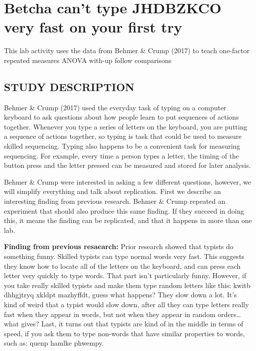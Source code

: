 \documentclass[
]{book}
\begin{document}
\hypertarget{betcha-cant-type-jhdbzkco-very-fast-on-your-first-try}{%
\section{Betcha can't type JHDBZKCO very fast on your first try}\label{betcha-cant-type-jhdbzkco-very-fast-on-your-first-try}}

This lab activity uses the data from Behmer \& Crump (2017) to teach one-factor repeated measures ANOVA with-up follow comparisons

\hypertarget{study-description-4}{%
\subsection{STUDY DESCRIPTION}\label{study-description-4}}

Behmer \& Crump (2017) used the everyday task of typing on a computer keyboard to ask questions about how people learn to put sequences of actions together. Whenever you type a series of letters on the keyboard, you are putting a sequence of actions together, so typing is task that could be used to measure skilled sequencing. Typing also happens to be a convenient task for measuring sequencing. For example, every time a person types a letter, the timing of the button press and the letter pressed can be measured and stored for later analysis.

Behmer \& Crump were interested in asking a few different questions, however, we will simplify everything and talk about replication. First we describe an interesting finding from previous research. Behmer \& Crump repeated an experiment that should also produce this same finding. If they succeed in doing this, it means the finding can be replicated, and that it happens in more than one lab.

\textbf{Finding from previous resaearch:} Prior research showed that typists do something funny. Skilled typists can type normal words very fast. This suggests they know how to locate all of the letters on the keyboard, and can press each letter very quickly to type words. That part isn't particularly funny. However, if you take really skilled typists and make them type random letters like this: kwitb dhhgjtryq xkldpt mazhyffdt, guess what happens? They slow down a lot. It's kind of weird that a typist would slow down, after all they can type letters really fast when they appear in words, but not when they appear in random orders\ldots what gives? Last, it turns out that typists are kind of in the middle in terms of speed, if you ask them to type non-words that have similar properties to words, such as: quenp hamlke phwempy.
\end{document}
